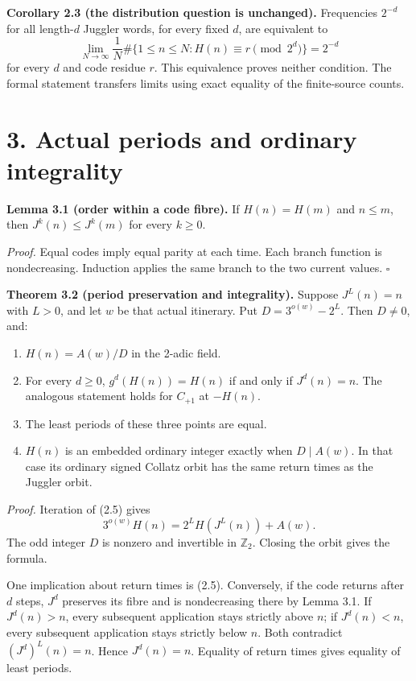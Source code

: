\documentclass[11pt,a4paper]{article}
\providecommand{\tightlist}{\setlength{\itemsep}{0pt}\setlength{\parskip}{0pt}}
\begin{document}
\textbf{Corollary 2.3 (the distribution question is unchanged).}
Frequencies \(2^{-d}\) for all length-\(d\) Juggler words, for every
fixed \(d\), are equivalent to \[
\lim_{N\to\infty}\frac1N
\#\{1\le n\le N:H(n)\equiv r\pmod{2^d}\}=2^{-d}
\] for every \(d\) and code residue \(r\). This equivalence proves
neither condition. The formal statement transfers limits using exact
equality of the finite-source counts.

\section{3. Actual periods and ordinary
integrality}\label{actual-periods-and-ordinary-integrality}

\textbf{Lemma 3.1 (order within a code fibre).} If \(H(n)=H(m)\) and
\(n\le m\), then \(J^k(n)\le J^k(m)\) for every \(k\ge0\).

\emph{Proof.} Equal codes imply equal parity at each time. Each branch
function is nondecreasing. Induction applies the same branch to the two
current values. \(\square\)

\textbf{Theorem 3.2 (period preservation and integrality).} Suppose
\(J^L(n)=n\) with \(L>0\), and let \(w\) be that actual itinerary. Put
\(D=3^{o(w)}-2^L\). Then \(D\ne0\), and:

\begin{enumerate}
\def\labelenumi{\arabic{enumi}.}
\tightlist
\item
  \(H(n)=A(w)/D\) in the 2-adic field.
\item
  For every \(d\ge0\), \(g^d(H(n))=H(n)\) if and only if \(J^d(n)=n\).
  The analogous statement holds for \(C_{+1}\) at \(-H(n)\).
\item
  The least periods of these three points are equal.
\item
  \(H(n)\) is an embedded ordinary integer exactly when \(D\mid A(w)\).
  In that case its ordinary signed Collatz orbit has the same return
  times as the Juggler orbit.
\end{enumerate}

\emph{Proof.} Iteration of (2.5) gives \[
3^{o(w)}H(n)=2^LH(J^L(n))+A(w).
\] The odd integer \(D\) is nonzero and invertible in \(\mathbb Z_2\).
Closing the orbit gives the formula.

One implication about return times is (2.5). Conversely, if the code
returns after \(d\) steps, \(J^d\) preserves its fibre and is
nondecreasing there by Lemma 3.1. If \(J^d(n)>n\), every subsequent
application stays strictly above \(n\); if \(J^d(n)<n\), every
subsequent application stays strictly below \(n\). Both contradict
\((J^d)^L(n)=n\). Hence \(J^d(n)=n\). Equality of return times gives
equality of least periods.
\end{document}
